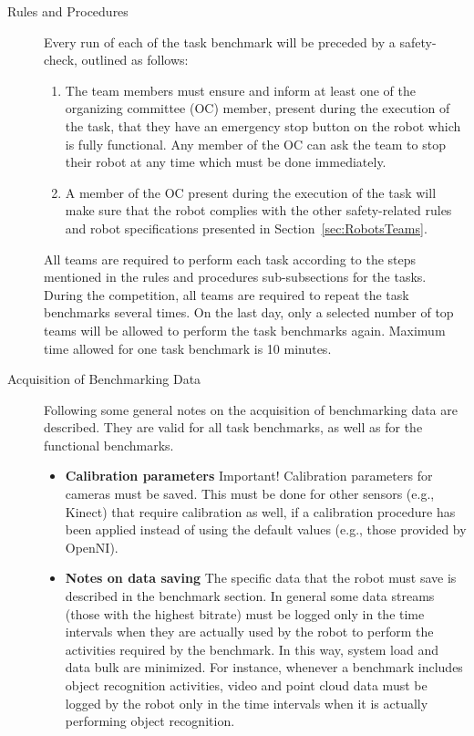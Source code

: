 \begin{description}
\item[Rules and Procedures] Every run of each of the task benchmark will be preceded by a safety-check, outlined as follows:
%
\begin{enumerate}
     \item The team members must ensure and inform at least one of the organizing committee (OC) member, present during the execution of the task, that they have an emergency stop button on the robot which is fully functional. Any member of the OC can ask the team to stop their robot at any time which must be done immediately.
     \item A member of the OC present during the execution of the task will make sure that the robot complies with the other safety-related rules and robot specifications presented in Section~\ref{sec:RobotsTeams}.
\end{enumerate}
%
All teams are required to perform each task according to the steps mentioned in the rules and procedures sub-subsections for the tasks. During the competition, all teams are required to repeat the task benchmarks several times. On the last day, only a selected number of top teams will be allowed to perform the task benchmarks again. Maximum time allowed for one task benchmark is 10 minutes. 

\item[Acquisition of Benchmarking Data]
\label{sec:TbmAcquisitionOfData}
Following some general notes on the acquisition of benchmarking data are described. They are valid for all task benchmarks, as well as for the functional benchmarks.

\begin{itemize}
\item{\textbf{Calibration parameters}}
Important! Calibration parameters for cameras must be saved. This must be done for other sensors (e.g., Kinect) that require calibration as well, if a calibration procedure has been applied instead of using the default values (e.g., those provided by OpenNI).

\item{\textbf{Notes on data saving}}
The specific data that the robot must save is described in the benchmark section. In general some data streams (those with the highest bitrate) must be logged only in the time intervals when they are actually used by the robot to perform the activities required by the benchmark. In this way, system load and data bulk are minimized. For instance, whenever a benchmark includes object recognition activities, video and point cloud data must be logged by the robot only in the time intervals when it is actually performing object recognition.


\end{itemize}
\end{description}
